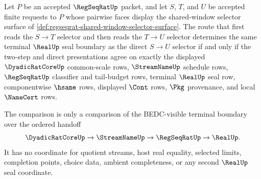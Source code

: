 \begin{theorem}
\label{thm:regseqrat-selector-composition-visible-boundary}
Let $P$ be an accepted $\RegSeqRatUp$ packet, and let $S$, $T$, and $U$ be accepted finite requests to $P$ whose pairwise faces display the shared-window selector surface of \autoref{def:regseqrat-shared-window-selector-surface}. The route that first reads the $S \to T$ selector and then reads the $T \to U$ selector determines the same terminal $\RealUp$ seal boundary as the direct $S \to U$ selector if and only if the two-step and direct presentations agree on exactly the displayed $\DyadicRatCoreUp$ common-scale rows, $\StreamNameUp$ schedule rows, $\RegSeqRatUp$ classifier and tail-budget rows, terminal $\RealUp$ seal row, componentwise $\hsame$ rows, displayed $\Cont$ rows, $\Pkg$ provenance, and local $\NameCert$ rows.

The comparison is only a comparison of the BEDC-visible terminal boundary over the ordered handoff
$$
\DyadicRatCoreUp \to \StreamNameUp \to \RegSeqRatUp \to \RealUp .
$$
It has no coordinate for quotient streams, host real equality, selected limits, completion points, choice data, ambient completeness, or any second $\RealUp$ seal coordinate.
\end{theorem}
